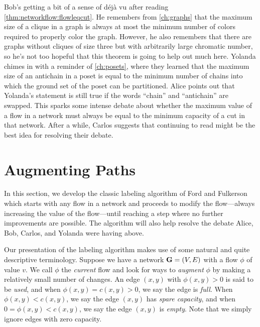 \begin{discussion}
  Bob's getting a bit of a sense of d\'ej\`a vu after reading
  \autoref{thm:networkflow:flowleqcut}. He remembers from
  \autoref{ch:graphs} that the maximum size of a clique in a graph is
  always at most the minimum number of colors required to properly
  color the graph. However, he also remembers that there are graphs
  without cliques of size three but with arbitrarily large chromatic
  number, so he's not too hopeful that this theorem is going to help
  out much here. Yolanda chimes in with a reminder of
  \autoref{ch:posets}, where they learned that the maximum size of an
  antichain in a poset is equal to the minimum number of chains into
  which the ground set of the poset can be partitioned. Alice points
  out that Yolanda's statement is still true if the words ``chain'' and
  ``antichain'' are swapped. This sparks some intense debate about
  whether the maximum value of a flow in a network must always be
  equal to the minimum capacity of a cut in that network. After a
  while, Carlos suggests that continuing to read might be the best
  idea for resolving their debate.
\end{discussion}

\section{Augmenting Paths}

In this section, we develop the classic labeling algorithm of
Ford and Fulkerson which starts with any flow in a network and
proceeds to modify the flow---always increasing 
the value of the flow---until reaching a step
where no further improvements are possible. The algorithm will also
help resolve the debate Alice, Bob, Carlos, and Yolanda were having
above.

Our presentation of the labeling algorithm makes use of some natural
and quite descriptive terminology.  Suppose we have a network $\mathbf{G}=(V,E)$
with a flow $\phi$ of value $v$.  We call $\phi$ the \textit{current}
flow and look for ways to \textit{augment} $\phi$ by making a
relatively small number of changes.  An edge $(x,y)$ with
$\phi(x,y)>0$ is said to be \textit{used}, and when
$\phi(x,y)=c(x,y)>0$, we say the edge is \textit{full}.  When
$\phi(x,y)<c(x,y)$, we say the edge $(x,y)$ has \textit{spare
  capacity}, and when $0=\phi(x,y)<c(x,y)$, we say the edge $(x,y)$
is \textit{empty}.  Note that we simply ignore edges with zero
capacity.

